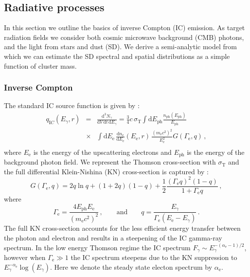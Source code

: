 \documentclass[10pt,aps,pra,reprint,amsmath,amsfonts,amssymb,showpacs]{revtex4-1}
\newcommand{\rmn}{\mathrm}
\newcommand{\ph}{\rmn{ph}}
\newcommand{\eph}{E_\ph}
\newcommand{\ee}{E_\rmn{e}}
\newcommand{\dd}{\rmn{d}}
\newcommand{\e}{\rmn{e}}
\newcommand{\eg}{E_\gamma}
\begin{document}
\subsection{Radiative processes}
In this section we outline the basics of inverse Compton (IC)
emission. As target radiation fields we consider both cosmic microwave
background (CMB) photons, and the light from stars and dust (SD). We
derive a semi-analytic model from which we can estimate the SD
spectral and spatial distributions as a simple function of cluster
mass.

\subsubsection{Inverse Compton}
\label{sect:IC}
The standard IC source function is given by
\cite{1979rpa..book.....R}:
\begin{eqnarray}
  q_{\rmn IC}(\eg, r) &=&  \frac{\dd^3 N_\gamma}{\dd V\,\dd t\,\dd \eg} = 
 \frac{3}{4}c\,\sigma_\rmn{T}
\int\dd \eph \frac{n_\rmn{ph}(\eph)}{\eph}\nonumber\\
&\times& \int \dd \ee\,\frac{\dd n_\e}{\dd \ee}(\ee,r)\,
 \frac{\left(m_\e c^2\right)^2}{\ee^2}G(\Gamma_\e,q)\,,\nonumber\\
  \label{eq:ICemiss}
\end{eqnarray}
where $\ee$ is the energy of the upscattering electrons and $\eph$ is
the energy of the background photon field. We represent the Thomson
cross-section with $\sigma_\rmn{T}$ and the full differential
Klein-Nishina (KN) cross-section is captured by
\cite{1970RvMP...42..237B}:
\begin{equation}
\label{eq:KN_spec}
G(\Gamma_\e,q) = 2q\ln{q}+(1+2q)(1-q)+ 
\frac{1}{2}\frac{\left(\Gamma_\e q\right)^2\left(1-q\right)}
     {1+\Gamma_\e q}\,,
\end{equation}
where
\begin{equation}
\Gamma_\e=\frac{4\eph \ee}{\left(m_\e c^2\right)^2}\,,\qquad \rmn{and} \qquad  
q=\frac{\eg}{\Gamma_\e\left(\ee-\eg\right)}\,.
\end{equation}
The full KN cross-section accounts for the less efficient energy
transfer between the photon and electron and results in a steepening
of the IC gamma-ray spectrum. In the low energy Thomson regime the IC
spectrum $F_\gamma\sim E_\gamma^{-(\alpha_\e-1)/2}$, however when
$\Gamma_\e \gg 1$ the IC spectrum steepens due to the KN suppression
to $\eg^{-\alpha_\e}\log(\eg)$. Here we denote the steady
state electon spectrum by $\alpha_\e$.
\end{document}
